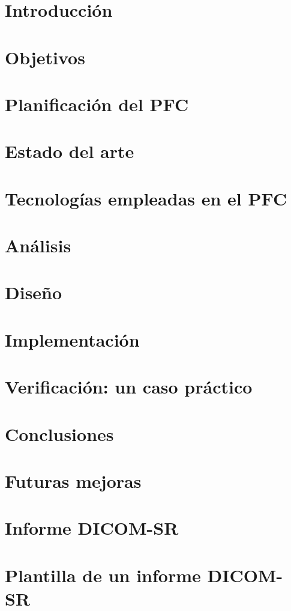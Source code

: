 \documentclass[12pt,a4paper,titlepage,twoside]{report}
\begin{document}
\chapter{Introducción}


\chapter{Objetivos}


\chapter{Planificación del PFC}


\chapter{Estado del arte }\label{arte}


\chapter{Tecnologías empleadas en el PFC}


\chapter{Análisis}


\chapter{Diseño}


\chapter{Implementación}


\chapter{Verificación: un caso práctico}


\chapter{Conclusiones}


\chapter{Futuras mejoras}\label{mejoras}





\appendix
\chapter{Informe DICOM-SR}\label{dicom-sr}


\chapter{Plantilla de un informe DICOM-SR}\label{dicom-sr-template}

\end{document}
